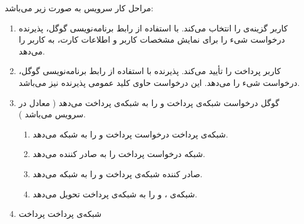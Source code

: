 \documentclass[oneside]{report}
\begin{document}
      مراحل کار سرویس 
            	{\normalsize {}} 
            	به صورت زیر می‌باشد:
     \begin{enumerate}
     	\item 
     	کاربر گزینه‌ی 
     	{\normalsize {}} 
     	را انتخاب می‌کند. با استفاده از رابط برنامه‌نویسی گوگل، پذیرنده درخواست شیء
     	{\normalsize {}} 
     	را برای نمایش مشخصات کاربر و اطلاعات کارت، به کاربر را می‌دهد.
     	\item 
     	کاربر پرداخت را تأیید می‌کند. پذیرنده با استفاده از رابط برنامه‌نویسی گوگل، درخواست شیء
     	{\normalsize {}} 
     	را می‌دهد. این درخواست حاوی کلید عمومی 
     	پذیرنده نیز می‌باشد. 
     	\item 
     	گوگل درخواست 
     	{\normalsize {}} 
     	شبکه‌ی پرداخت و 
     	{\normalsize {}} 
     	را به شبکه‌ی پرداخت می‌دهد
     (
     {\normalsize {}} 
     معادل 
     {\normalsize {}} 
     در سرویس
     {\normalsize {}} 
     می‌باشد
     ).
     \begin{enumerate}
     	\item
     	شبکه‌ی پرداخت درخواست 
     	     {\normalsize {}} 
     	     پرداخت 
     	     و 
     	          {\normalsize {}} 
     	          را به 
     	               {\normalsize {}}  
     	           شبکه    می‌دهد.
     \item
     شبکه
                         {\normalsize {}}
                         درخواست 
                              {\normalsize {}} پرداخت را به 
                              صادر کننده می‌دهد. 
     \item 
     صادر کننده‌ 
          {\normalsize {}} 
          شبکه‌ی پرداخت و
               {\normalsize {}} 
           را به 
               {\normalsize {}} 
               شبکه‌ می‌دهد.                    
     \item
     شبکه‌ی 
          {\normalsize {}} 
          ،      {\normalsize {}} 
          و 
               {\normalsize {}} 
               را به شبکه‌ی پرداخت تحویل می‌دهد.                       
     \end{enumerate}
	 \item
	شبکه‌ی پرداخت 
	     {\normalsize {}} پرداخت 

\end{enumerate}
\end{document}
